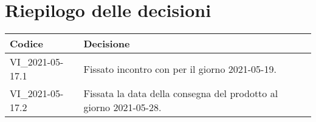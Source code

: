 \section{Riepilogo delle decisioni}
\setcounter{table}{-1}
{

\centering
\renewcommand{\arraystretch}{1.5}
\begin{longtable}{>{\centering}p{} >{}p{}}
\rowcolor{azzurro1}
\textbf{Codice} &
\centerline{\textbf{Decisione}}\\
\endhead

VI{\_}2021-05-17.1 & Fissato incontro con \proponProg{} per il giorno 2021-05-19.\\
VI{\_}2021-05-17.2 & Fissata la data della consegna del prodotto al giorno 2021-05-28.\\
\end{longtable}
}